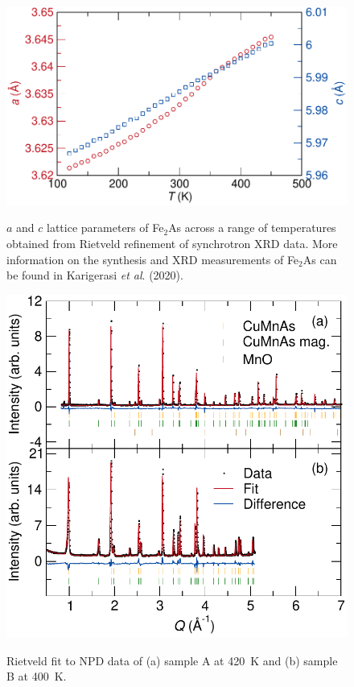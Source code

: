 \documentclass[letterpaper,10pt,doublespacing,edeposit]{uiucthesis2020}
\begin{document}
\begin{mainmatter}
\begin{figure}[h]
\centering\includegraphics[width=0.7\columnwidth]{figures/ch7/Fe2As_lattice_constants_cropped.pdf} \\
\caption{\label{fig:Fe2As}
$a$ and $c$ lattice parameters of Fe$_2$As across a range of temperatures obtained from Rietveld refinement of synchrotron XRD data. More information on the synthesis and XRD measurements of Fe$_2$As can be found in Karigerasi \emph{et al}. (2020).
} 
\end{figure}

\begin{figure}[h]
\centering\includegraphics[width=0.7\columnwidth]{figures/ch7/suppl_rietveld_fit_samples_400K_cropped.pdf} \\
\caption{\label{fig:400K_rietveld_fit}
Rietveld fit to NPD data of (a) sample A at 420~K and (b) sample B at 400~K. 
} 
\end{figure}


\end{mainmatter}
\end{document}
